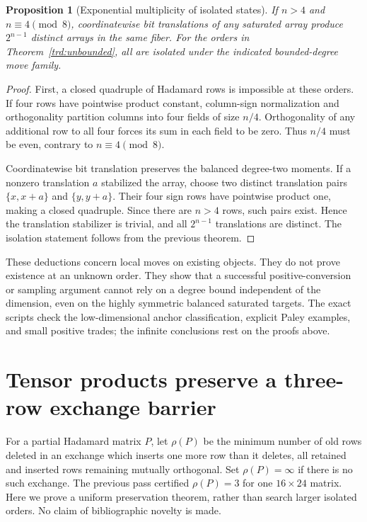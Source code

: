 \documentclass[11pt]{article}
\newtheorem{proposition}[theorem]{Proposition}
\begin{document}
\begin{proposition}[Exponential multiplicity of isolated states]
If $n>4$ and $n\equiv4\pmod8$, coordinatewise bit translations of
any saturated array produce $2^{n-1}$ distinct arrays in the same fiber.
For the orders in Theorem~\ref{trd:unbounded}, all are isolated under
the indicated bounded-degree move family.
\end{proposition}
\begin{proof}
First, a closed quadruple of Hadamard rows is impossible at these
orders. If four rows have pointwise product constant, column-sign
normalization and orthogonality partition columns into four fields
of size $n/4$. Orthogonality of any additional row to all four forces
its sum in each field to be zero. Thus $n/4$ must be even, contrary
to $n\equiv4\pmod8$.

Coordinatewise bit translation preserves the balanced degree-two
moments. If a nonzero translation $a$ stabilized the array, choose
two distinct translation pairs $\{x,x+a\}$ and $\{y,y+a\}$. Their four
sign rows have pointwise product one, making a closed quadruple.
Since there are $n>4$ rows, such pairs exist. Hence the translation
stabilizer is trivial, and all $2^{n-1}$ translations are distinct.
The isolation statement follows from the previous theorem.
\end{proof}

These deductions concern local moves on existing objects. They do not
prove existence at an unknown order. They show that a successful
positive-conversion or sampling argument cannot rely on a degree bound
independent of the dimension, even on the highly symmetric balanced
saturated targets. The exact scripts check the low-dimensional anchor
classification, explicit Paley examples, and small positive trades; the
infinite conclusions rest on the proofs above.

\section{Tensor products preserve a three-row exchange barrier}
For a partial Hadamard matrix $P$, let $\rho(P)$ be the minimum number
of old rows deleted in an exchange which inserts one more row than it
deletes, all retained and inserted rows remaining mutually orthogonal.
Set $\rho(P)=\infty$ if there is no such exchange. The previous pass
certified $\rho(P)=3$ for one $16\times24$ matrix. Here we prove a
uniform preservation theorem, rather than search larger isolated orders.
No claim of bibliographic novelty is made.
\end{document}
